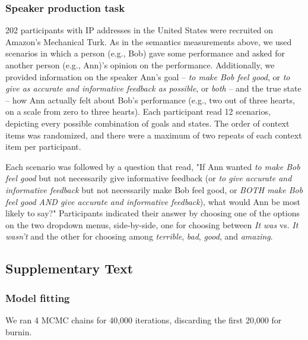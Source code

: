 \documentclass[12pt]{article}
\begin{document}
\subsubsection*{Speaker production task}

202 participants with IP addresses in the United States were recruited on Amazon's Mechanical Turk.
As in the semantics measurements above, we used scenarios in which a person (e.g., Bob) gave some performance and asked for another person (e.g., Ann)'s opinion on the performance. 
Additionally, we provided information on the speaker Ann's goal -- \emph{to make Bob feel good}, or \emph{to give as accurate and informative feedback as possible}, or \emph{both} -- 
and the true state -- how Ann actually felt about Bob's performance (e.g., two out of three hearts, on a scale from zero to three hearts). 
Each participant read 12 scenarios, depicting every possible combination of goals and states. 
The order of context items was randomized, and there were a maximum of two repeats of each context item per participant.

Each scenario was followed by a question that read, "If Ann wanted \emph{to make Bob feel good} but not necessarily give informative feedback (or \emph{to give accurate and informative feedback} but not necessarily make Bob feel good, or \emph{BOTH make Bob feel good AND give accurate and informative feedback}), what would Ann be most likely to say?" Participants indicated their answer by choosing one of the options on the two dropdown menus, side-by-side, one for choosing between \emph{It was} vs. \emph{It wasn't} and the other for choosing among \emph{terrible}, \emph{bad}, \emph{good}, and \emph{amazing}.

\subsection*{Supplementary Text}

\subsubsection*{Model fitting}

We ran 4 MCMC chains for 40,000 iterations, discarding the first 20,000 for burnin. 
\end{document}
